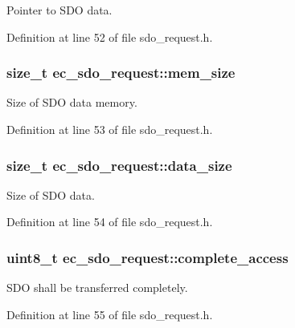 Pointer to S\-D\-O data. 



Definition at line 52 of file sdo\-\_\-request.\-h.

\subsubsection[{mem\-\_\-size}]{\setlength{\rightskip}{0pt plus 5cm}size\-\_\-t ec\-\_\-sdo\-\_\-request\-::mem\-\_\-size}\label{structec__sdo__request_a6275d28bba5bc2a428915b717fe425e5}


Size of S\-D\-O data memory. 



Definition at line 53 of file sdo\-\_\-request.\-h.

\subsubsection[{data\-\_\-size}]{\setlength{\rightskip}{0pt plus 5cm}size\-\_\-t ec\-\_\-sdo\-\_\-request\-::data\-\_\-size}\label{structec__sdo__request_a9a094314f738ed0fdf4b46f4bd37dfe9}


Size of S\-D\-O data. 



Definition at line 54 of file sdo\-\_\-request.\-h.

\subsubsection[{complete\-\_\-access}]{\setlength{\rightskip}{0pt plus 5cm}uint8\-\_\-t ec\-\_\-sdo\-\_\-request\-::complete\-\_\-access}\label{structec__sdo__request_a98a6142382d920ac06195dd6b6de2990}


S\-D\-O shall be transferred completely. 



Definition at line 55 of file sdo\-\_\-request.\-h.

